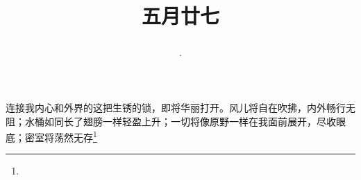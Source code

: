 \title{\date[d=2,m=7,y=2024][year:cn-y,年,month:cn,day:cn,日,·,weekday]·五月廿七 }
连接我内心和外界的这把生锈的锁，即将华丽打开。风儿将自在吹拂，内外畅行无阻；水桶如同长了翅膀一样轻盈上升；一切将像原野一样在我面前展开，尽收眼底；密室将荡然无存\footnote{ }

